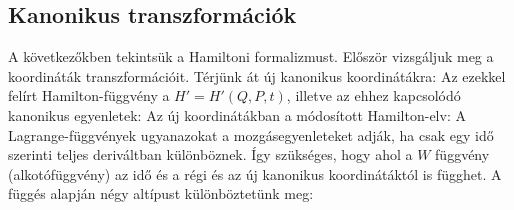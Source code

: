    
  
   
  \subsection{Kanonikus transzformációk}
   
   A következőkben tekintsük a Hamiltoni formalizmust. Először vizsgáljuk meg a koordináták transzformációit. Térjünk át új kanonikus koordinátákra:
   Az ezekkel felírt Hamilton-függvény a $H'=H'(Q,P,t)$, illetve az ehhez kapcsolódó kanonikus egyenletek: 
   Az új koordinátákban a módosított Hamilton-elv:
   A Lagrange-függvények ugyanazokat a mozgásegyenleteket adják, ha csak egy idő szerinti teljes deriváltban különböznek. Így szükséges, hogy 
   ahol a $W$ függvény (alkotófüggvény) az idő és a régi és az új kanonikus koordinátáktól is függhet. A függés alapján négy altípust különböztetünk meg:
